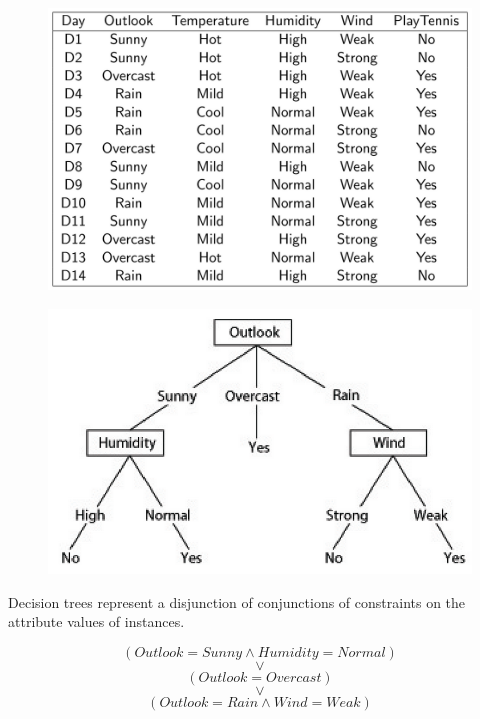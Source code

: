 \begin{figure}[H]
    \centering
    \includegraphics[width=12cm]{images/Decision Trees/Screenshot_20221004_141548.png}
    \caption{}
    \label{fig:image2.2}
\end{figure}


\begin{figure}[H]
    \centering
    \includegraphics[width=12cm]{images/Decision Trees/Screenshot_20221004_141630.png}
    \caption{}
    \label{fig:image2.3}
\end{figure}

Decision trees represent a disjunction of conjunctions of constraints on the attribute values of instances.

\[(Outlook = Sunny \land Humidity = Normal)\] \[\lor\]
\[(Outlook = Overcast)\] \[\lor\]
\[(Outlook = Rain \land Wind = Weak)\]


